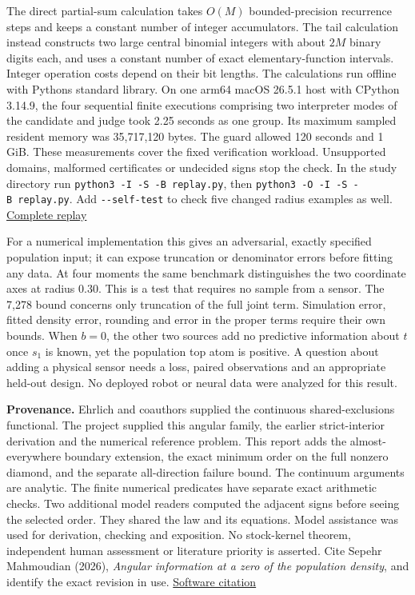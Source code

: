 The direct partial-sum calculation takes \(O(M)\) bounded-precision recurrence steps and keeps a constant number of integer accumulators. The tail calculation instead constructs two large central binomial integers with about \(2M\) binary digits each, and uses a constant number of exact elementary-function intervals. Integer operation costs depend on their bit lengths. The calculations run offline with Python\textquotesingle s standard library. On one arm64 macOS 26.5.1 host with CPython 3.14.9, the four sequential finite executions comprising two interpreter modes of the candidate and judge took 2.25 seconds as one group. Its maximum sampled resident memory was 35,717,120 bytes. The guard allowed 120 seconds and 1 GiB. These measurements cover the fixed verification workload. Unsupported domains, malformed certificates or undecided signs stop the check. In the study directory run \texttt{python3\ -I\ -S\ -B\ replay.py}, then \texttt{python3\ -O\ -I\ -S\ -B\ replay.py}. Add \texttt{-\/-self-test} to check five changed radius examples as well. \href{https://github.com/sepahead/pid-rs/blob/main/audit/research/angular-unit-boundary/replay.py}{Complete replay}

For a numerical implementation this gives an adversarial, exactly specified population input; it can expose truncation or denominator errors before fitting any data. At four moments the same benchmark distinguishes the two coordinate axes at radius \(0.30\). This is a test that requires no sample from a sensor. The 7,278 bound concerns only truncation of the full joint term. Simulation error, fitted density error, rounding and error in the proper terms require their own bounds. When \(b=0\), the other two sources add no predictive information about \(t\) once \(s_1\) is known, yet the population top atom is positive. A question about adding a physical sensor needs a loss, paired observations and an appropriate held-out design. No deployed robot or neural data were analyzed for this result.

\textbf{Provenance.} Ehrlich and coauthors supplied the continuous shared-exclusions functional. The project supplied this angular family, the earlier strict-interior derivation and the numerical reference problem. This report adds the almost-everywhere boundary extension, the exact minimum order on the full nonzero diamond, and the separate all-direction failure bound. The continuum arguments are analytic. The finite numerical predicates have separate exact arithmetic checks. Two additional model readers computed the adjacent signs before seeing the selected order. They shared the law and its equations. Model assistance was used for derivation, checking and exposition. No stock-kernel theorem, independent human assessment or literature priority is asserted. Cite Sepehr Mahmoudian (2026), \emph{Angular information at a zero of the population density}, and identify the exact revision in use. \href{https://github.com/sepahead/pid-rs/blob/main/CITATION.cff}{Software citation}

